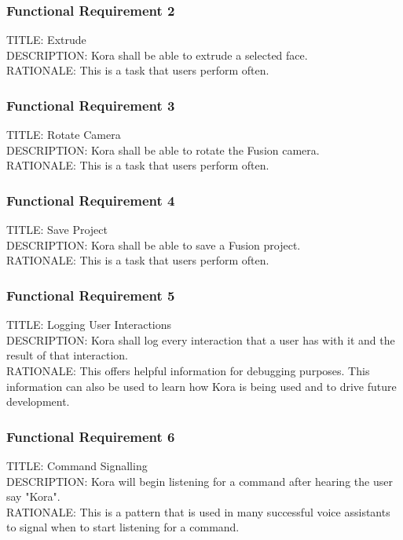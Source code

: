 \documentclass[onecolumn, draftclsnofoot,10pt, compsoc]{IEEEtran}
\def \botname{Kora\xspace}
\begin{document}
        \subsubsection{Functional Requirement 2}
        TITLE: Extrude \\
        DESCRIPTION: \botname shall be able to extrude a selected face. \\
        RATIONALE: This is a task that users perform often.
        
        \subsubsection{Functional Requirement 3}
        TITLE: Rotate Camera \\
        DESCRIPTION: \botname shall be able to rotate the Fusion camera. \\
        RATIONALE: This is a task that users perform often.
        
        \subsubsection{Functional Requirement 4}
        TITLE: Save Project \\
        DESCRIPTION: \botname shall be able to save a Fusion project. \\
        RATIONALE: This is a task that users perform often.
        
        \subsubsection{Functional Requirement 5}
        TITLE: Logging User Interactions \\
        DESCRIPTION: \botname shall log every interaction that a user has with it and the result of that interaction. \\
        RATIONALE: This offers helpful information for debugging purposes. This information can also be used to learn how \botname is being used and to drive future development.
       
        \subsubsection{Functional Requirement 6}
        TITLE: Command Signalling \\
        DESCRIPTION: \botname will begin listening for a command after hearing the user say "\botname". \\
        RATIONALE: This is a pattern that is used in many successful voice assistants to signal when to start listening for a command.
\end{document}
